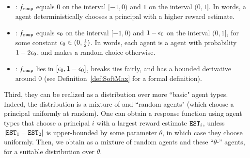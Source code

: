 \begin{itemize}
\item \HardMax: $f_{\mathtt{resp}}$ equals $0$ on the interval $[-1,0)$ and $1$
  on the interval $(0,1]$. In words, a \HardMax agent
  deterministically chooses a principal with a higher reward estimate.

\item \HardMaxRandom:
    $f_{\mathtt{resp}}$ equals $\epsilon_0$ on the interval $[-1,0)$ and $1-\epsilon_0$ on the interval $(0,1]$, for some constant $\epsilon_0\in (0,\tfrac12)$. In words, each agent is a \HardMax agent with probability $1-2\epsilon_0$, and makes a random choice otherwise.

\item \SoftMaxRandom: $f_{\mathtt{resp}}$  lies in $[\epsilon_0,1-\epsilon_0]$, breaks ties fairly, and has a bounded derivative around $0$ (see Definition~\ref{def:SoftMax} for a formal definition). 
\end{itemize}

Third, they can be realized as a distribution over more ``basic" agent types. Indeed, the \HardMaxRandom distribution is a mixture of \HardMax and ``random agents" (which choose a principal uniformly at random). 
One can obtain a \SoftMaxRandom response function using agent types that choose a principal $i$ with a largest reward estimate $\mathtt{EST}_i$, unless $|\mathtt{EST}_1-\mathtt{EST}_2|$ is upper-bounded by some parameter $\theta$, in which case they choose uniformly. Then, we obtain \SoftMaxRandom as a mixture of random agents and these ``$\theta$-\HardMax'' agents, for a suitable distribution over $\theta$.


